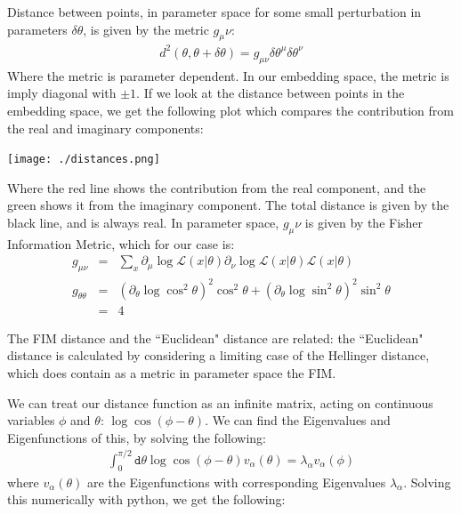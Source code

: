 \documentclass[11pt]{article}
\begin{document}
Distance between points, in parameter space for some small perturbation in parameters $\delta\theta$, is given by the metric $g_\mu\nu$:
\begin{eqnarray}
d^2(\theta,\theta+\delta\theta) = g_{\mu\nu}\delta\theta^\mu\delta\theta^\nu
\end{eqnarray}
Where the metric is parameter dependent. In our embedding space, the metric is imply diagonal with $\pm 1$. If we look at the distance between points in the embedding space, we get the following plot which compares the contribution from the real and imaginary components:

\begin{center}
\texttt{[image: ./distances.png]}
\end{center}

Where the red line shows the contribution from the real component, and the green shows it from the imaginary component. The total distance is given by the black line, and is always real. In parameter space, $g_\mu\nu$ is given by the Fisher Information Metric, which for our case is:
\begin{eqnarray}
g_{\mu\nu} &=& \sum_x \partial_\mu\log\mathcal{L}(x|\theta)\partial_\nu\log\mathcal{L}(x|\theta)\mathcal{L}(x|\theta)\nonumber\\
g_{\theta\theta} &=& \left(\partial_\theta\log\cos^2\theta\right)^2\cos^2\theta + \left(\partial_\theta\log\sin^2\theta\right)^2\sin^2\theta \nonumber\\
&=& 4
\end{eqnarray}

The FIM distance and the ``Euclidean" distance are related: the ``Euclidean" distance is calculated by considering a limiting case of the Hellinger distance, which does contain as a metric in parameter space the FIM.

We can treat our distance function as an infinite matrix, acting on continuous variables $\phi$ and $\theta$: $\log\cos(\phi-\theta)$. We can find the Eigenvalues and Eigenfunctions of this, by solving the following:
\begin{eqnarray}
\int_0^{\pi/2}\texttt{d}\theta\log\cos(\phi - \theta)v_\alpha (\theta) = \lambda_\alpha v_\alpha(\phi)
\end{eqnarray}
where $v_\alpha(\theta)$ are the Eigenfunctions with corresponding Eigenvalues $\lambda_\alpha$. Solving this numerically with python, we get the following:
\end{document}
